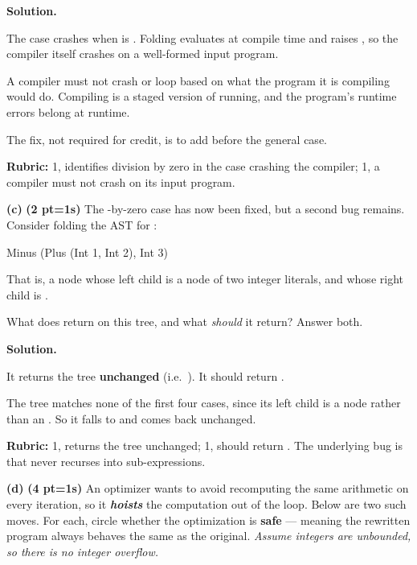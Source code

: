 \documentclass[crop=false]{standalone}
\newif\ifsol
\newenvironment{solution}
    {\par\color{solution_color}\begin{framed}\textbf{Solution.}\par}
    {\end{framed}}
\newcommand{\term}[1]{\textbf{\textit{#1}}}
\newcommand{\subpts}[1]{\textbf{(#1 pt\ifnum#1=1\else s\fi)}}
\newcommand{\answerspace}[1]{\ifsol\else\vspace{#1}\par\fi}
\begin{document}
\begin{solution}
The  case crashes when  is . Folding
 evaluates  at compile time and
raises , so the compiler itself crashes on a well-formed input
program.

A compiler must not crash or loop based on what the program it is
compiling would do. Compiling is a staged version of running, and the
program's runtime errors belong at runtime.

The fix, not required for credit, is to add
 before the general  case.

\textbf{Rubric:} 1, identifies division by zero in the  case
crashing the compiler; 1, a compiler must not crash on its input
program.
\end{solution}

\textbf{(c)} \subpts{2} The -by-zero case has now been fixed,
but a second bug remains. Consider folding the AST for
:

\begin{codeblock}
  Minus (Plus (Int 1, Int 2), Int 3)
\end{codeblock}

\noindent That is, a  node whose left child is a 
node of two integer literals, and whose right child is .

What does  return on this tree, and what \emph{should} it
return? Answer both.

\answerspace{2.5cm}

\begin{solution}
It returns the tree \textbf{unchanged} (i.e.\ ). It should return .

The tree matches none of the first four cases, since its left child is
a  node rather than an . So it falls to
 and comes back unchanged.

\textbf{Rubric:} 1, returns the tree unchanged; 1, should return
. The underlying bug is that  never recurses
into sub-expressions.
\end{solution}


\textbf{(d)} \subpts{4} An optimizer wants to avoid recomputing the same
arithmetic on every iteration, so it \term{hoists} the computation out of
the loop. Below are two such moves. For each, circle whether the
optimization is \textbf{safe} --- meaning the rewritten program always
behaves the same as the original. \emph{Assume integers are unbounded,
so there is no integer overflow.}
\end{document}
